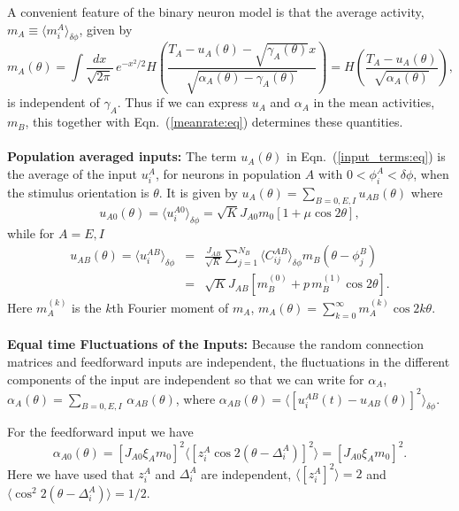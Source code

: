 A convenient feature of the binary neuron model is that the average activity,
$m_A\equiv\langle m_i^A\rangle_{\delta\phi}$, given by
\begin{equation}
m_A(\theta)=\int\!\frac{dx}{\sqrt{2\pi}}\,e^{-x^2/2}
H\left(\frac{T_A-u_A(\theta)-\sqrt{\gamma_A(\theta)}x}
{ \sqrt{\alpha_A(\theta)-\gamma_A(\theta)}}\right)
=H\left(\frac{T_A-u_A(\theta)}{\sqrt{\alpha_A(\theta)}}\right),
\label{meanrate:eq}
\end{equation}
is independent of $\gamma_A$\@. Thus if we can express $u_A$ and $\alpha_A$ in 
the mean activities, $m_B$, this together with Eqn.~(\ref{meanrate:eq}) 
determines these quantities.\\
 \\
{\bf Population averaged inputs:}
The term $u_A(\theta)$ in Eqn.~(\ref{input_terms:eq}) is the average 
of the input $u_i^A$, for neurons 
in population $A$ with $0<\phi_i^A<\delta \phi$, when the stimulus orientation is $\theta$.
It is given by 
$u_A(\theta)=\sum_{B=0,E,I}u_{AB}(\theta)$ where
\begin{equation}
u_{A0}(\theta)=\langle u_i^{A0}\rangle_{\delta\phi}= 
\sqrt{K}J_{A0}m_0[1+\mu\cos 2\theta],
\label{uA0:eq}
\end{equation}
while for $A=E,I$
\begin{eqnarray}
u_{AB}(\theta) = \langle u_i^{AB}\rangle_{\delta\phi} & = & \frac{J_{AB}}{\sqrt{K}} \sum_{j=1}^{N_B}
\langle C_{ij}^{AB}\rangle_{\delta\phi}m_B(\theta-\phi_j^B)
\nonumber \\
& = & \sqrt{K}J_{AB}\left[ m_B^{(0)}+p\,m_B^{(1)}\cos 2\theta\right].
\label{uAB:eq}
\end{eqnarray}
Here $m_A^{(k)}$ is the $k$th Fourier moment of $m_A$, $m_A(\theta)=
\sum_{k=0}^\infty m_A^{(k)}\cos 2k\theta$\@.\\
 \\
{\bf Equal time Fluctuations of the Inputs:}
Because the random connection matrices and feedforward inputs 
are independent, the fluctuations in the different components of the 
input are independent so that we can write for $\alpha_A$,
$\alpha_A(\theta)=\sum_{B=0,E,I}\,\alpha_{AB}(\theta)$,
where $\alpha_{AB}(\theta)=
\langle [u_i^{AB}(t)-u_{AB}(\theta)]^2\rangle_{\delta\phi}$\@.

For the feedforward input we have
\begin{equation}  
\alpha_{A0}(\theta) = [J_{A0}\xi_A m_0]^2
\langle[z_i^A\cos 2(\theta-\Delta_i^A)]^2\rangle
= [J_{A0}\xi_A m_0]^2.
\label{alA0:eq}
\end{equation}
Here we have used that $z_i^A$ and $\Delta_i^A$ are independent, 
$\langle [z_i^A]^2\rangle=2$ and $\langle \cos^2 2(\theta-\Delta_i^A)\rangle=1/2$\@.

